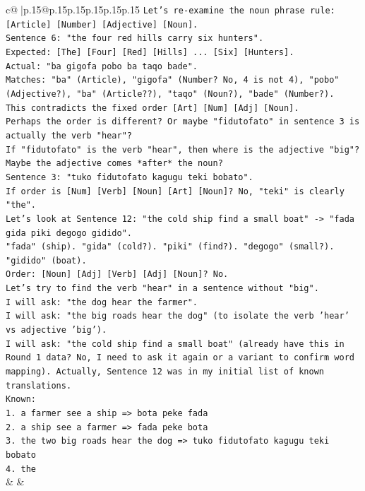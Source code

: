 \documentclass{article}
\begin{document}
{\begin{supertabular}{c@{$\;$}|p{.15\linewidth}@{}p{.15\linewidth}p{.15\linewidth}p{.15\linewidth}p{.15\linewidth}p{.15\linewidth}}
{{{\texttt{Let's re{-}examine the noun phrase rule: {[}Article{]} {[}Number{]} {[}Adjective{]} {[}Noun{]}.} \\
\texttt{Sentence 6: "the four red hills carry six hunters".} \\
\texttt{Expected: {[}The{]} {[}Four{]} {[}Red{]} {[}Hills{]} ... {[}Six{]} {[}Hunters{]}.} \\
\texttt{Actual: "ba gigofa pobo ba taqo bade".} \\
\texttt{Matches: "ba" (Article), "gigofa" (Number? No, 4 is not 4), "pobo" (Adjective?), "ba" (Article??), "taqo" (Noun?), "bade" (Number?).} \\
\texttt{This contradicts the fixed order {[}Art{]} {[}Num{]} {[}Adj{]} {[}Noun{]}.} \\
\texttt{Perhaps the order is different? Or maybe "fidutofato" in sentence 3 is actually the verb "hear"?} \\
\texttt{If "fidutofato" is the verb "hear", then where is the adjective "big"?} \\
\texttt{Maybe the adjective comes *after* the noun?} \\
\texttt{Sentence 3: "tuko fidutofato kagugu teki bobato".} \\
\texttt{If order is {[}Num{]} {[}Verb{]} {[}Noun{]} {[}Art{]} {[}Noun{]}? No, "teki" is clearly "the".} \\
\texttt{Let's look at Sentence 12: "the cold ship find a small boat" {-}> "fada gida piki degogo gidido".} \\
\texttt{"fada" (ship). "gida" (cold?). "piki" (find?). "degogo" (small?). "gidido" (boat).} \\
\texttt{Order: {[}Noun{]} {[}Adj{]} {[}Verb{]} {[}Adj{]} {[}Noun{]}? No.} \\
\texttt{Let's try to find the verb "hear" in a sentence without "big".} \\
\texttt{I will ask: "the dog hear the farmer".} \\
\texttt{I will ask: "the big roads hear the dog" (to isolate the verb 'hear' vs adjective 'big').} \\
\texttt{I will ask: "the cold ship find a small boat" (already have this in Round 1 data? No, I need to ask it again or a variant to confirm word mapping). Actually, Sentence 12 was in my initial list of known translations.} \\
\texttt{Known:} \\
\texttt{1. a farmer see a ship => bota peke fada} \\
\texttt{2. a ship see a farmer => fada peke bota} \\
\texttt{3. the two big roads hear the dog => tuko fidutofato kagugu teki bobato} \\
\texttt{4. the} \\
            }
        }
    }
    & & \\ \\


\end{supertabular}}
\end{document}
